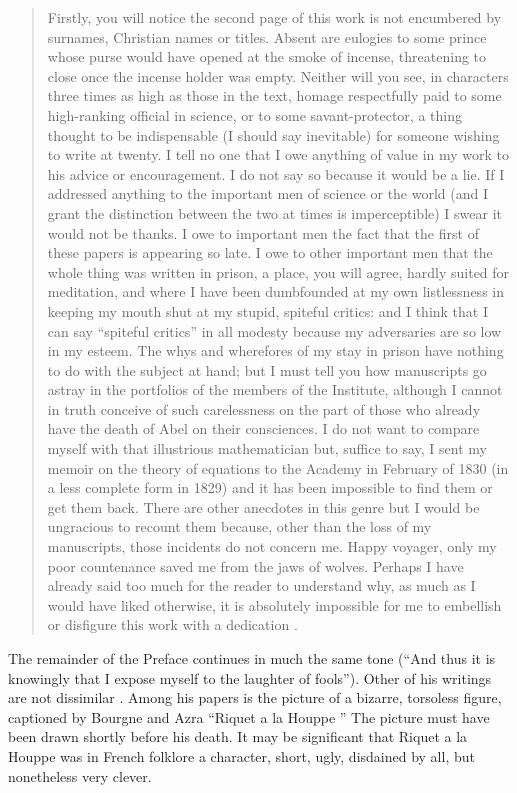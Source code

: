 \documentclass[12pt]{article}
\begin{document}
\begin{quote}
Firstly, you will notice the second page of this work is not encumbered by surnames, Christian names or titles. Absent are eulogies to some prince whose purse would have opened at the smoke of incense, threatening to close once the incense holder was empty. Neither will you see, in characters three times as high as those in the text, homage respectfully paid to some high-ranking official in science, or to some savant-protector, a thing thought to be indispensable (I should say inevitable) for someone wishing to write at twenty. I tell no one that I owe anything of value in my work to his advice or encouragement. I do not say so because it would be a lie. If I addressed anything to the important men of science or the world (and I grant the distinction between the two at times is imperceptible) I swear it would not be thanks. I owe to important men the fact that the first of these papers is appearing so late. I owe to other important men that the whole thing was written in prison, a place, you will agree, hardly suited for meditation, and where I have been dumbfounded at my own listlessness in keeping my mouth shut at my stupid, spiteful critics: and I think that I can say ``spiteful critics'' in all modesty because my adversaries are so low in my esteem. The whys and wherefores of my stay in prison have nothing to do with the subject at hand; but I must tell you how manuscripts go astray in the portfolios of the members of the Institute, although I cannot in truth conceive of such carelessness on the part of those who already have the death of Abel on their consciences. I do not want to compare myself with that illustrious mathematician but, suffice to say, I sent my memoir on the theory of equations to the Academy in February of 1830 (in a less complete form in 1829) and it has been impossible to find them or get them back. There are other anecdotes in this genre but I would be ungracious to recount them because, other than the loss of my manuscripts, those incidents do not concern me. Happy voyager, only my poor countenance saved me from the jaws of wolves. Perhaps I have already said too much for the reader to understand why, as much as I would have liked otherwise, it is absolutely impossible for me to embellish or disfigure this work with a dedication \cite{73}.
\end{quote}

The remainder of the Preface continues in much the same tone (``And thus it is knowingly that I expose myself to the laughter of fools''). Other of his writings are not dissimilar \cite{74}. Among his papers is the picture of a bizarre, torsoless figure, captioned by Bourgne and Azra ``Riquet a la Houppe \cite{75}'' The picture must have been drawn shortly before his death. It may be significant that Riquet a la Houppe was in French folklore a character, short, ugly, disdained by all, but nonetheless very clever.
\end{document}

